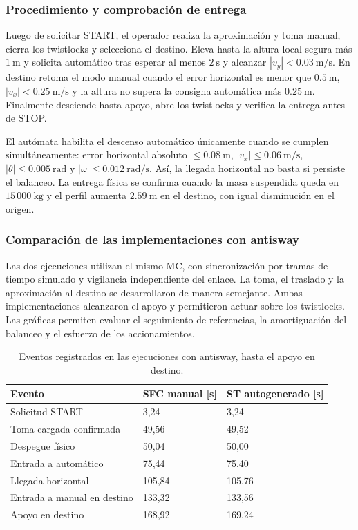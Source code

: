

\subsubsection{Procedimiento y comprobación de entrega}
Luego de solicitar START, el operador realiza la aproximación y toma manual, cierra los twistlocks y selecciona el destino. Eleva hasta la altura local segura más $1~\mathrm{m}$ y solicita automático tras esperar al menos $2~\mathrm{s}$ y alcanzar $|v_y|<0.03~\mathrm{m/s}$. En destino retoma el modo manual cuando el error horizontal es menor que $0.5~\mathrm{m}$, $|v_x|<0.25~\mathrm{m/s}$ y la altura no supera la consigna automática más $0.25~\mathrm{m}$. Finalmente desciende hasta apoyo, abre los twistlocks y verifica la entrega antes de STOP.

El autómata habilita el descenso automático únicamente cuando se cumplen simultáneamente: error horizontal absoluto $\leq0.08~\mathrm{m}$, $|v_x|\leq0.06~\mathrm{m/s}$, $|\theta|\leq0.005~\mathrm{rad}$ y $|\omega|\leq0.012~\mathrm{rad/s}$. Así, la llegada horizontal no basta si persiste el balanceo. La entrega física se confirma cuando la masa suspendida queda en $15\,000~\mathrm{kg}$ y el perfil aumenta $2.59~\mathrm{m}$ en el destino, con igual disminución en el origen.


\subsubsection{Comparación de las implementaciones con antisway}
\label{sec:ensayo_codesys_manual}
\label{sec:ensayo_codesys_st}
Las dos ejecuciones utilizan el mismo MC, con sincronización por tramas de tiempo simulado y vigilancia independiente del enlace. La toma, el traslado y la aproximación al destino se desarrollaron de manera semejante. Ambas implementaciones alcanzaron el apoyo y permitieron actuar sobre los twistlocks. Las gráficas permiten evaluar el seguimiento de referencias, la amortiguación del balanceo y el esfuerzo de los accionamientos.

\begin{table}[H]\centering\small
	\caption{Eventos registrados en las ejecuciones con antisway, hasta el apoyo en destino.}
	\label{tab:eventos_con_sw_0810}
	\begin{tabular}{L{.44\textwidth}C{.18\textwidth}C{.18\textwidth}}\toprule
		Evento & SFC manual [s] & ST autogenerado [s]\\\midrule
		Solicitud START & 3,24 & 3,24\\
		Toma cargada confirmada & 49,56 & 49,52\\
		Despegue físico & 50,04 & 50,00\\
		Entrada a automático & 75,44 & 75,40\\
		Llegada horizontal & 105,84 & 105,76\\
		Entrada a manual en destino & 133,32 & 133,56\\
		Apoyo en destino & 168,92 & 169,24\\\bottomrule
\end{tabular}\end{table}

